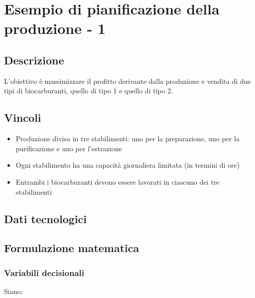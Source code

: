 \section{Esempio di pianificazione della produzione - 1}
\subsection{Descrizione}

L'obiettivo è massimizzare il profitto derivante dalla produzione e vendita di due tipi di biocarburanti, quello di tipo 1 e quello di tipo 2.

\subsection{Vincoli}
\begin{itemize}
    \item Produzione divisa in tre stabilimenti: uno per la preparazione, uno per la purificazione e uno per l'estrazione
    \item Ogni stabilimento ha una capacità giornaliera limitata (in termini di ore)
    \item Entrambi i biocarburanti devono essere lavorati in ciascuno dei tre stabilimenti
\end{itemize}
\subsection{Dati tecnologici}
\begin{table}[h]
\centering
{}
\end{table}

\subsection{Formulazione matematica}
\subsubsection{Variabili decisionali}
Siano:

